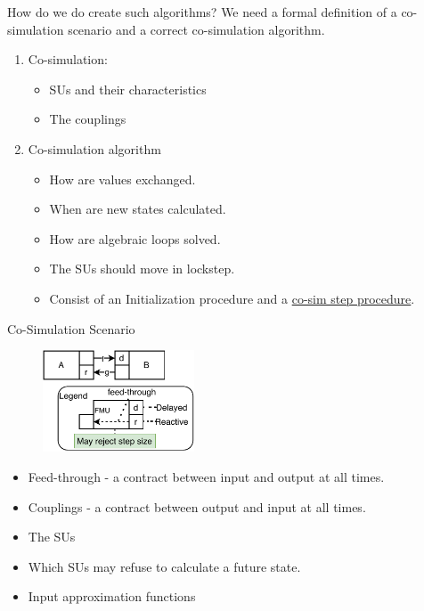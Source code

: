 \documentclass{beamer}
\begin{document}
\begin{frame}{How do we do create such algorithms?}
    We need a formal definition of a co-simulation scenario and a correct co-simulation algorithm.
    \begin{enumerate}
        \item Co-simulation:
        \begin{itemize}
            \item SUs and their characteristics
            \item The couplings
        \end{itemize}
        \item Co-simulation algorithm
        \begin{itemize}
            \item How are values exchanged.
            \item When are new states calculated. 
            \item How are algebraic loops solved.
            \item The SUs should move in lockstep.
            \item Consist of an Initialization procedure and a \underline{co-sim step procedure}.
        \end{itemize}
    \end{enumerate}
\end{frame}

\begin{frame}{Co-Simulation Scenario}
    \begin{figure}    
        \includegraphics[width=0.4\textwidth]{images/simple_example_legend.pdf}
    \end{figure}
    \begin{itemize}
        \item Feed-through - a contract between input and output at all times.
        \item Couplings - a contract between output and input at all times.
        \item The SUs
        \item Which SUs may refuse to calculate a future state.
        \item Input approximation functions
    \end{itemize}
\end{frame}
\end{document}
